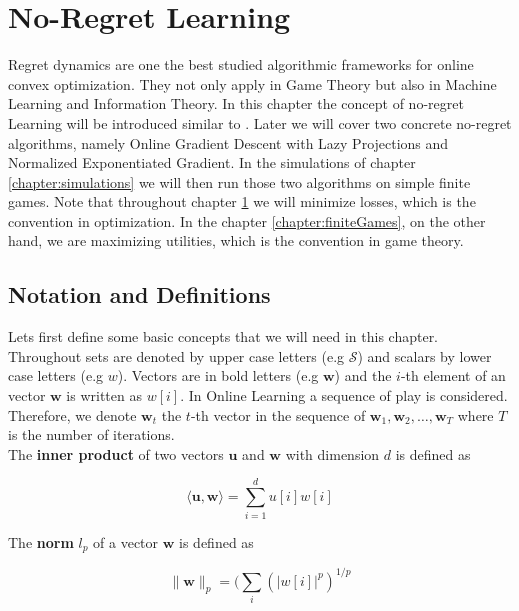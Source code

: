 
\chapter{No-Regret Learning}\label{chapter:noRegretLearning}

Regret dynamics are one the best studied algorithmic frameworks for online convex optimization. They not only apply in Game Theory but also in Machine Learning and Information Theory. In this chapter the concept of no-regret Learning will be introduced similar to \cite[Chapter 2 Online Convex Optimization]{shalev}. Later we will cover two concrete no-regret algorithms, namely Online Gradient Descent with Lazy Projections and Normalized Exponentiated Gradient. In the simulations of chapter \ref{chapter:simulations} we will then run those two algorithms on simple finite games. Note that throughout chapter \ref{chapter:noRegretLearning} we will minimize losses, which is the convention in optimization. In the chapter \ref{chapter:finiteGames}, on the other hand, we are maximizing utilities, which is the convention in game theory.

\section{Notation and Definitions}\label{section:notationAndDefinitionsRegret}

Lets first define some basic concepts that we will need in this chapter. Throughout sets are denoted by upper case letters (e.g $\mathcal{S}$) and scalars by lower case letters (e.g $w$). Vectors are in bold letters (e.g $\boldsymbol{w}$) and the $i$-th element of an vector $\boldsymbol{w}$ is written as $w[i]$. In Online Learning a sequence of play is considered. Therefore, we denote $\boldsymbol{w}_t$ the $t$-th vector in the sequence of $\boldsymbol{w}_1,\boldsymbol{w}_2,\dots,\boldsymbol{w}_T$ where $T$ is the number of iterations. \\
The \textbf{inner product} of two vectors $\boldsymbol{u}$ and $\boldsymbol{w}$ with dimension $d$ is defined as 

\begin{equation*}
    \langle \boldsymbol{u},\boldsymbol{w}\rangle = \sum_{i=1}^{d}u[i]w[i]
\end{equation*}

The \textbf{norm} $l_p$ of a vector $\boldsymbol{w}$ is defined as

\begin{equation*}
    \|\boldsymbol{w}\|_p = (\sum_{i}(|w[i]|^p)^{1/p}
\end{equation*}

